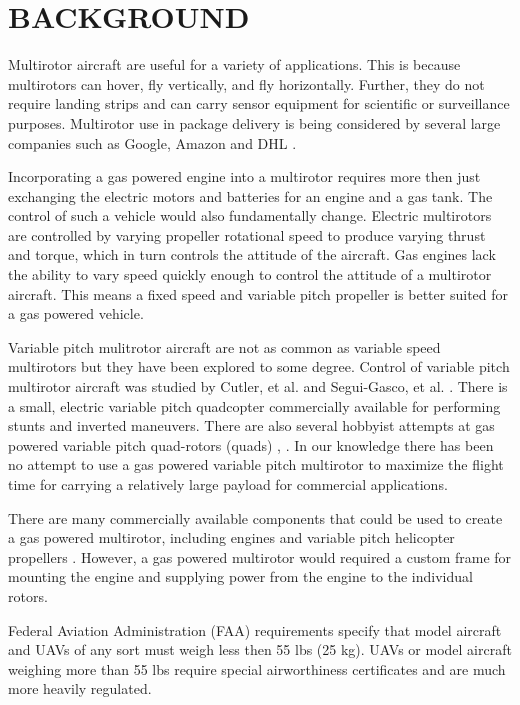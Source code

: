 \documentclass[letterpaper, 10 pt, conference]{ieeeconf}  %
\begin{document}
\section{BACKGROUND}

Multirotor aircraft are useful for a variety of applications. This is because multirotors can hover, fly vertically, and fly horizontally. Further, they do not require landing strips and can carry sensor equipment for scientific or surveillance purposes. Multirotor use in package delivery is being considered by several large companies such as Google, Amazon and DHL \cite{Amazon2014}.   

Incorporating a gas powered engine into a multirotor requires more then just exchanging the electric motors and batteries for an engine and a gas tank. The control of such a vehicle would also fundamentally change.  Electric multirotors are controlled by varying propeller rotational speed to produce varying thrust and torque, which in turn controls the attitude of the aircraft. Gas engines lack the ability to vary speed quickly enough to control the attitude of a multirotor aircraft. This means a fixed speed and variable pitch propeller is better suited for a gas powered vehicle.

Variable pitch mulitrotor aircraft are not as common as variable speed multirotors but they have been explored to some degree. Control of variable pitch multirotor aircraft was studied by Cutler, et al. \cite{Cutler2012}\cite{Cutler2012a} and Segui-Gasco, et al. \cite{Segui-Gasco2014}. There is a small, electric variable pitch quadcopter commercially available \cite{stingray2016} for performing stunts and inverted maneuvers.  There are also several hobbyist attempts at gas powered variable pitch quad-rotors (quads) \cite{diy2016}, \cite{hackaday2016}. In our knowledge there has been no attempt to use a gas powered variable pitch multirotor to maximize the flight time for carrying a relatively large payload for commercial applications. 

There are many commercially available components that could be used to create a gas powered multirotor, including engines \cite{da2016} and variable pitch helicopter propellers \cite{align2016}. However, a gas powered multirotor would required a custom frame for mounting the engine and supplying power from the engine to the individual rotors.

Federal Aviation Administration (FAA) requirements \cite{faa2016} specify that model aircraft and UAVs of any sort must weigh less then 55 lbs (25 kg). UAVs or model aircraft weighing more than 55 lbs require special airworthiness certificates and are much more heavily regulated.
\end{document}
